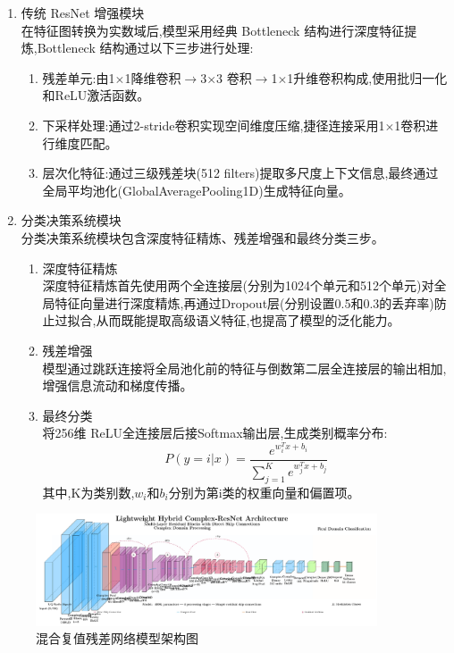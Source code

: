 \documentclass{article}
\begin{document}
\begin{CJK}{UTF8}{gbsn}
\begin{enumerate}
\begin{itemize}
\begin{itemize}
        \end{itemize}
    \end{itemize}
    \item 传统 ResNet 增强模块 \\
    在特征图转换为实数域后,模型采用经典 Bottleneck 结构进行深度特征提炼,Bottleneck 结构通过以下三步进行处理:
    \begin{enumerate}
        \item 残差单元:由1$\times$1降维卷积$\rightarrow$3$\times$3 卷积$\rightarrow$1$\times$1升维卷积构成,使用批归一化和ReLU激活函数。
        \item 下采样处理:通过2-stride卷积实现空间维度压缩,捷径连接采用1$\times$1卷积进行维度匹配。
        \item 层次化特征:通过三级残差块(512 filters)提取多尺度上下文信息,最终通过全局平均池化(GlobalAveragePooling1D)生成特征向量。
    \end{enumerate}
    \item 分类决策系统模块 \\
    分类决策系统模块包含深度特征精炼、残差增强和最终分类三步。
    \begin{enumerate}
        \item 深度特征精炼 \\
        深度特征精炼首先使用两个全连接层(分别为1024个单元和512个单元)对全局特征向量进行深度精炼,再通过Dropout层(分别设置0.5和0.3的丢弃率)防止过拟合,从而既能提取高级语义特征,也提高了模型的泛化能力。
        \item 残差增强 \\
        模型通过跳跃连接将全局池化前的特征与倒数第二层全连接层的输出相加,增强信息流动和梯度传播。
        \item 最终分类 \\
        将256维 ReLU全连接层后接Softmax输出层,生成类别概率分布:
        \begin{equation}
            P(y=i|x)=\frac{e^{w_{i}^{T}x+b_{i}}}{\sum_{j=1}^{K}e^{w_{j}^{T}x+b_{j}}}
            \label{eq:softmax_final}
        \end{equation}
        其中,K为类别数,$w_{i}$和$b_{i}$分别为第i类的权重向量和偏置项。
    \end{enumerate}
\end{enumerate}

\begin{figure}[H]
    \centering
    \includegraphics[width=0.9\textwidth]{figure/image8.png}
    \caption{混合复值残差网络模型架构图}
    \label{fig:hybrid_architecture}
\end{figure}


\end{CJK}
\end{document}
